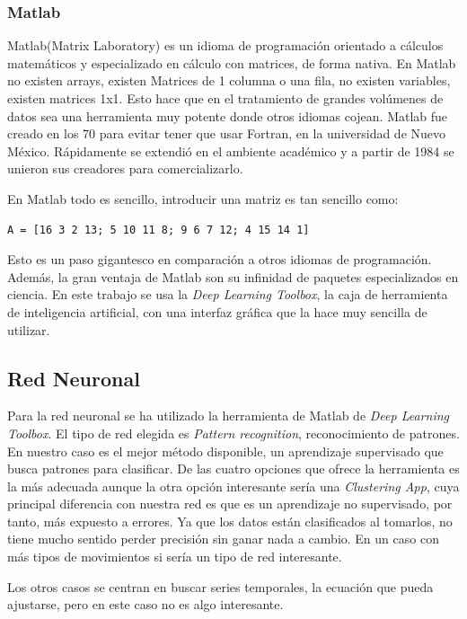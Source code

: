 \documentclass[12pt]{article}
\numberwithin{equation}{section}
\begin{document}
{\subsubsection{Matlab}

Matlab(Matrix Laboratory) es un idioma de programación orientado a cálculos matemáticos y especializado en cálculo con matrices, de forma nativa. En Matlab no existen arrays, existen Matrices de 1 columna o una fila, no existen variables, existen matrices 1x1. Esto hace que en el tratamiento de grandes volúmenes de datos sea una herramienta muy potente donde otros idiomas cojean. Matlab fue creado en los 70 para evitar tener que usar Fortran, en la universidad de Nuevo México. Rápidamente se extendió en el ambiente académico y a partir de 1984 se unieron sus creadores para comercializarlo. 

En Matlab todo es sencillo, introducir una matriz es tan sencillo como:
\lstset{language=matlab}
\begin{lstlisting}
A = [16 3 2 13; 5 10 11 8; 9 6 7 12; 4 15 14 1]
\end{lstlisting}

Esto es un paso gigantesco en comparación a otros idiomas de programación. Además, la gran ventaja de Matlab son su infinidad de paquetes especializados en ciencia. En este trabajo se usa la \textit{Deep Learning Toolbox}, la caja de herramienta de inteligencia artificial, con una interfaz gráfica que la hace muy sencilla de utilizar.

\subsection{Red Neuronal}

Para la red neuronal se ha utilizado la herramienta de Matlab de \textit{Deep Learning Toolbox}\cite{Matlab}. El tipo de red elegida es  \textit{Pattern recognition}, reconocimiento de patrones. En nuestro caso es el mejor método disponible, un aprendizaje supervisado que busca patrones para clasificar. De las cuatro opciones que ofrece la herramienta es la más adecuada aunque la otra opción interesante sería una \textit{Clustering App}, cuya principal diferencia con nuestra red es que es un aprendizaje no supervisado, por tanto, más expuesto a errores. Ya que los datos están clasificados al tomarlos, no tiene mucho sentido perder precisión sin ganar nada a cambio. En un caso con más tipos de movimientos si sería un tipo de red interesante.

Los otros casos se centran en buscar series temporales, la ecuación que pueda ajustarse, pero en este caso no es algo interesante.

}
\end{document}
